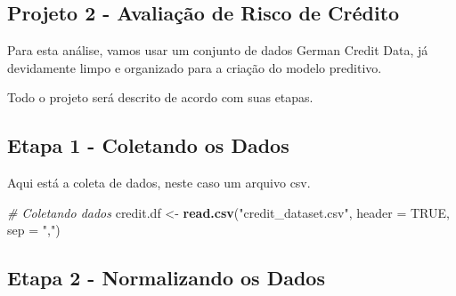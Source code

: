 \documentclass[
]{article}
\author{}
\date{\vspace{-2.5em}}
\newenvironment{Shaded}{\begin{snugshade}}{\end{snugshade}}
\newcommand{\CommentTok}[1]{\textcolor[rgb]{0.56,0.35,0.01}{\textit{#1}}}
\newcommand{\DataTypeTok}[1]{\textcolor[rgb]{0.13,0.29,0.53}{#1}}
\newcommand{\KeywordTok}[1]{\textcolor[rgb]{0.13,0.29,0.53}{\textbf{#1}}}
\newcommand{\NormalTok}[1]{#1}
\newcommand{\OtherTok}[1]{\textcolor[rgb]{0.56,0.35,0.01}{#1}}
\newcommand{\StringTok}[1]{\textcolor[rgb]{0.31,0.60,0.02}{#1}}
\begin{document}
\hypertarget{projeto-2---avaliauxe7uxe3o-de-risco-de-cruxe9dito}{%
\subsection{Projeto 2 - Avaliação de Risco de
Crédito}\label{projeto-2---avaliauxe7uxe3o-de-risco-de-cruxe9dito}}

Para esta análise, vamos usar um conjunto de dados German Credit Data,
já devidamente limpo e organizado para a criação do modelo preditivo.

Todo o projeto será descrito de acordo com suas etapas.

\hypertarget{etapa-1---coletando-os-dados}{%
\subsection{Etapa 1 - Coletando os
Dados}\label{etapa-1---coletando-os-dados}}

Aqui está a coleta de dados, neste caso um arquivo csv.

\begin{Shaded}
\begin{Highlighting}[]
\CommentTok{# Coletando dados}
\NormalTok{credit.df <-}\StringTok{ }\KeywordTok{read.csv}\NormalTok{(}\StringTok{"credit_dataset.csv"}\NormalTok{, }\DataTypeTok{header =} \OtherTok{TRUE}\NormalTok{, }\DataTypeTok{sep =} \StringTok{","}\NormalTok{)}
\end{Highlighting}
\end{Shaded}

\hypertarget{etapa-2---normalizando-os-dados}{%
\subsection{Etapa 2 - Normalizando os
Dados}\label{etapa-2---normalizando-os-dados}}
\end{document}
